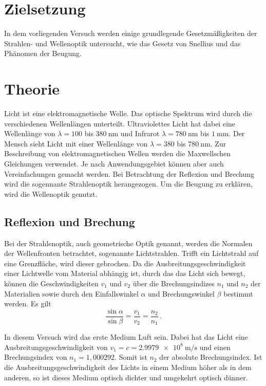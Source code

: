 \section{Zielsetzung}
    In dem vorliegenden Versuch werden einige grundlegende Gesetzmäßigkeiten der Strahlen- und Wellenoptik untersucht, 
    wie das Gesetz von Snellius und das Phänomen der Beugung.

\section{Theorie}
\label{sec:Theorie}
    Licht ist eine elektromagnetische Welle.
    Das optische Spektrum wird durch die verschiedenen Wellenlängen unterteilt.
    Ultraviolettes Licht hat dabei eine Wellenlänge von $\lambda = 100$ bis $\SI{380}{\nano\metre}$ und Infrarot $\lambda = \SI{780}{\nano\metre}$ bis $\SI{1}{\milli\metre}$.
    Der Mensch sieht Licht mit einer Wellenlänge von $\lambda = 380 $ bis $\SI{780}{\nano\metre}$.
    Zur Beschreibung von elektromagnetischen Wellen werden die Maxwellschen Gleichungen verwendet.
    Je nach Anwendungsgebiet können aber auch Vereinfachungen gemacht werden.
    Bei Betrachtung der Reflexion und Brechung wird die sogennante Strahlenoptik herangezogen.
    Um die Beugung zu erklären, wird die Wellenoptik genutzt.

\subsection{Reflexion und Brechung}
\label{subsec:Reflexion_Brechung}
    Bei der Strahlenoptik, auch geometrische Optik genannt, werden die Normalen der Wellenfronten betrachtet, sogenannte Lichtstrahlen.
    Trifft ein Lichtstrahl auf eine Grenzfläche, wird dieser gebrochen.
    Da die Ausbreitungsgeschwindigkeit einer Lichtwelle vom Material abhängig ist, durch das das Licht sich bewegt, können die Geschwindigkeiten $v_1$ und $v_2$ über die Brechungsindizes $n_1$ und $n_2$
    der Materialien sowie durch den Einfallswinkel $\alpha$ und Brechungswinkel $\beta$ bestimmt werden.
    Es gilt
    \begin{equation*}
        \frac{\sin \alpha}{\sin \beta} = \frac{v_1}{v_2} = \frac{n_2}{n_1} \, .
    \end{equation*}

    \noindent
    In diesem Versuch wird das erste Medium Luft sein.
    Dabei hat das Licht eine Ausbreitungsgeschwindigkeit von $v_1 = c = \SI{2.9979e8}{\metre\per\second}$ und einen Brechungsindex von $n_1 = 1,000292$.
    Somit ist $n_2$ der absolute Brechungsindex.
    Ist die Ausbreitungsgeschwindigkeit des Lichts in einem Medium höher als in dem anderen, so ist dieses Medium optisch dichter und umgekehrt optisch dünner.

